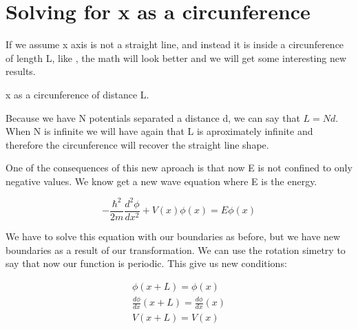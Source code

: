 \section{Solving for x as a circunference}

If we assume x axis is not a straight line, and instead it is inside a circunference of length L, like , the math will look better and we will get some interesting new results.

\begin{marginfigure}
    \caption[x as a circunference]{x as a circunference of distance L.}
\end{marginfigure}

Because we have N potentials separated a distance d, we can say that $L= Nd$. When N is infinite we will have again that L is aproximately infinite and therefore the circunference will recover the straight line shape.

One of the consequences of this new aproach is that now E is not confined to only negative values. We know get a new wave equation where E is the energy.

\begin{equation}
  \label{5.15}
  -\frac{\hbar^2}{2m}\frac{d^2\phi}{dx^2} + V(x)\phi(x) = E\phi(x)
\end{equation}

We have to solve this equation with our boundaries as before, but we have new boundaries as a result of our transformation. We can use the rotation simetry to say that now our function is periodic. This give us new conditions:


\begin{equation}
  \label{5.16}
  \begin{array}{c}
    \phi(x+L) = \phi(x)

    \\

    \frac{d\phi}{dx}(x+L) = \frac{d\phi}{dx}(x)

    \\

    V(x+L) = V(x)
  \end{array}
\end{equation}

